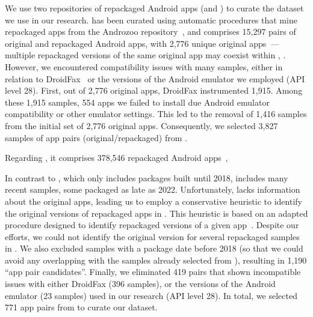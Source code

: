We use two repositories of repackaged Android apps (\repack and \amc) to
curate the dataset we use in our research. \repack has been curated using automatic procedures that mine repackaged apps from the Androzoo
repository~\cite{DBLP:conf/msr/AllixBKT16}, and
comprises 15,297 pairs of original and repackaged Android apps, with 2,776 unique original apps~\cite{DBLP:journals/tse/LiBK21}---
multiple repackaged versions of the same original app may coexist within \repack, .
However, we encountered compatibility issues with many samples, either in relation to DroidFax~\cite{DBLP:conf/icsm/CaiR17a} or the versions of the Android emulator we employed (API level 28). First, out of 2,776 original apps, DroidFax instrumented 1,915. Among these 1,915 samples, 554 apps we failed to install due Android emulator compatibility or other emulator settings. This led to the removal of 1,416 samples from the initial set of 2,776 original apps. Consequently, we selected 3,827 samples of app pairs (original/repackaged) from \repack. 


Regarding \amc, it comprises 378,546 repackaged Android apps~\cite{andromalpack}, 

In contrast to \repack,
which only includes packages built until 2018, \amc includes many recent samples, some packaged as late as 2022.
Unfortunately, \amc lacks information about the original apps, leading us to employ a conservative heuristic
to identify the original versions of repackaged apps in \amc. This heuristic is based on an adapted
procedure designed to identify repackaged versions of a given app~\cite{DBLP:journals/tse/LiBK21}.
Despite our efforts, we could not identify the original version for several repackaged samples in \amc.
We also excluded samples with a package date before 2018 (so that we could avoid any overlapping with
the samples already selected from \repack), resulting in 1,190 ``app pair candidates''.
Finally, we eliminated 419 pairs that shown incompatible issues with either DroidFax (396 samples), or the versions of the Android
emulator (23 samples) used in our research (API level 28). In total, we selected 771 app pairs from \amc to curate our dataset.

